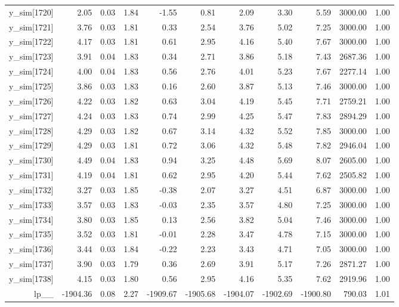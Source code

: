 \begin{table}[ht]
\begin{tabular}{rrrrrrrrrrr}
  y\_sim[1720] & 2.05 & 0.03 & 1.84 & -1.55 & 0.81 & 2.09 & 3.30 & 5.59 & 3000.00 & 1.00 \\ 
  y\_sim[1721] & 3.76 & 0.03 & 1.81 & 0.33 & 2.54 & 3.76 & 5.02 & 7.25 & 3000.00 & 1.00 \\ 
  y\_sim[1722] & 4.17 & 0.03 & 1.81 & 0.61 & 2.95 & 4.16 & 5.40 & 7.67 & 3000.00 & 1.00 \\ 
  y\_sim[1723] & 3.91 & 0.04 & 1.83 & 0.34 & 2.71 & 3.86 & 5.18 & 7.43 & 2687.36 & 1.00 \\ 
  y\_sim[1724] & 4.00 & 0.04 & 1.83 & 0.56 & 2.76 & 4.01 & 5.23 & 7.67 & 2277.14 & 1.00 \\ 
  y\_sim[1725] & 3.86 & 0.03 & 1.83 & 0.16 & 2.60 & 3.87 & 5.13 & 7.46 & 3000.00 & 1.00 \\ 
  y\_sim[1726] & 4.22 & 0.03 & 1.82 & 0.63 & 3.04 & 4.19 & 5.45 & 7.71 & 2759.21 & 1.00 \\ 
  y\_sim[1727] & 4.24 & 0.03 & 1.83 & 0.74 & 2.99 & 4.25 & 5.47 & 7.83 & 2894.29 & 1.00 \\ 
  y\_sim[1728] & 4.29 & 0.03 & 1.82 & 0.67 & 3.14 & 4.32 & 5.52 & 7.85 & 3000.00 & 1.00 \\ 
  y\_sim[1729] & 4.29 & 0.03 & 1.81 & 0.72 & 3.06 & 4.32 & 5.48 & 7.82 & 2946.04 & 1.00 \\ 
  y\_sim[1730] & 4.49 & 0.04 & 1.83 & 0.94 & 3.25 & 4.48 & 5.69 & 8.07 & 2605.00 & 1.00 \\ 
  y\_sim[1731] & 4.19 & 0.04 & 1.81 & 0.62 & 2.95 & 4.20 & 5.44 & 7.62 & 2505.82 & 1.00 \\ 
  y\_sim[1732] & 3.27 & 0.03 & 1.85 & -0.38 & 2.07 & 3.27 & 4.51 & 6.87 & 3000.00 & 1.00 \\ 
  y\_sim[1733] & 3.57 & 0.03 & 1.83 & -0.03 & 2.35 & 3.57 & 4.80 & 7.25 & 3000.00 & 1.00 \\ 
  y\_sim[1734] & 3.80 & 0.03 & 1.85 & 0.13 & 2.56 & 3.82 & 5.04 & 7.46 & 3000.00 & 1.00 \\ 
  y\_sim[1735] & 3.52 & 0.03 & 1.81 & -0.01 & 2.28 & 3.47 & 4.78 & 7.15 & 3000.00 & 1.00 \\ 
  y\_sim[1736] & 3.44 & 0.03 & 1.84 & -0.22 & 2.23 & 3.43 & 4.71 & 7.05 & 3000.00 & 1.00 \\ 
  y\_sim[1737] & 3.90 & 0.03 & 1.79 & 0.36 & 2.69 & 3.91 & 5.17 & 7.26 & 2871.27 & 1.00 \\ 
  y\_sim[1738] & 4.15 & 0.03 & 1.80 & 0.56 & 2.95 & 4.16 & 5.35 & 7.62 & 2919.96 & 1.00 \\ 
  lp\_\_ & -1904.36 & 0.08 & 2.27 & -1909.67 & -1905.68 & -1904.07 & -1902.69 & -1900.80 & 790.03 & 1.01 \\ 
   \hline
\end{tabular}
\end{table}
